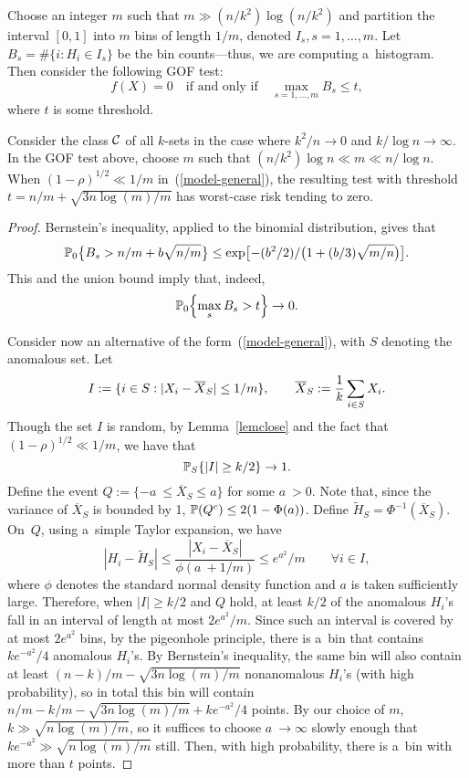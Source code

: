 \documentclass[10pt, oneside]{article}
\begin{document}
Choose an integer $m$ such that $m \gg(n/k^2) \log(n/k^2)$ and partition
the interval $[0,1]$ into $m$ bins of length $1/m$, denoted $I_s,  s =
1,\ldots, m$. Let $B_s = \# \{i: H_i \in I_s\}$ be the bin
counts---thus, we are computing a~histogram. Then consider the
following GOF test:
%
\[
f(X)=0  \quad\mbox{if and only if}\quad
\max_{s = 1,\ldots, m} B_s \leq t,
\]
%
where $t$ is some threshold.
%
%
\begin{prop} \label{prpgof}
Consider the class ${\mathcal C}$ of all $k$-sets in the case where $k^2/n \to
0$ and $k/\log n \to\infty$. In the GOF test above, choose $m$ such
that $(n/k^2) \log n \ll m \ll n/\log n$. When $(1-\rho)^{1/2} \ll
1/m$ in~(\ref{model-general}), the resulting test with threshold $t =
n/m + \sqrt{3 n \log(m)/m}$ has
worst-case
risk tending to zero.
\end{prop}
%
\begin{proof}
Bernstein's inequality, applied to the binomial distribution, gives that
%
\[
\mathbb{P}_0\bigl\{B_s > n/m + b \sqrt{n/m}\bigr\} \leq\exp\bigl[- (b^2/2)/\bigl(1 + (b/3)
\sqrt{m/n}\bigr)\bigr].
\]
%
This and the union bound imply that, indeed,
%
\[
\mathbb{P}_0\Bigl\{\max_s B_s > t\Bigr\} \to0.
\]

Consider now an alternative of the form~(\ref{model-general}), with
$S$ denoting the anomalous set. Let
%
\[
I := \{i \in S: |X_i - \overline{X}_S| \leq1/m\},\qquad  \overline
{X}_S := \frac1k \sum_{i \in S} X_i.\vadjust{\goodbreak}
\]
%
Though the set $I$ is random, by Lemma~\ref{lemclose} and the fact that
$(1-\rho)^{1/2} \ll1/m$, we have that
%
\[
\mathbb{P}_S\{|I| \geq k/2\} \to1.
\]
%
Define the event $Q := \{-a~\leq\overline{X}_S \leq a\}$ for some $a~> 0$. Note that, since the variance of $\overline{X}_S$ is bounded by
1, $\mathbb{P}(Q^c) \leq2 (1 - \Phi(a))$. Define $\tilde{H}_S = \Phi
^{-1}(\overline{X}_S)$. On~$Q$, using a~simple Taylor expansion, we have
%
\[
|H_i - \tilde{H}_S| \leq\frac{|X_i - \overline{X}_S|}{\phi(a~+
1/m)} \leq e^{a^2}/m\qquad \forall i \in I,
\]
%
where $\phi$ denotes the standard normal density function and $a$
is taken sufficiently large. Therefore, when $|I| \geq k/2$ and $Q$
hold, at least $k/2$ of the anomalous $H_i$'s fall in an interval of
length at most $2 e^{a^2}/m$. Since such an interval is covered by at
most $2 e^{a^2}$ bins, by the pigeonhole principle, there is a~bin
that contains $k e^{-a^2}/4$ anomalous $H_i$'s. By Bernstein's
inequality, the same bin will also contain at least $(n-k)/m -\sqrt{3
n \log(m)/m}$ nonanomalous $H_i$'s (with\vspace*{1pt} high probability), so in
total this bin will contain $n/m -k/m -\sqrt{3 n \log(m)/m} + k
e^{-a^2}/4$ points. By our choice of $m$, $k \gg\sqrt{n \log(m)/m}$,
so it suffices to choose $a~\to\infty$ slowly enough that $k e^{-a^2}
\gg\sqrt{n \log(m)/m}$ still. Then, with high probability, there is
a~bin with more than $t$ points.
\end{proof}
\end{document}
